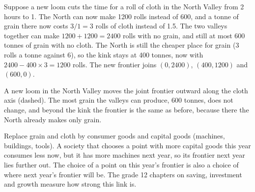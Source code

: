 \begin{example}\label{ex:g10:production-possibility-frontier:loom}
Suppose a new loom cuts the time for a roll of cloth in the North Valley from 2 hours to 1. The North
can now make \num{1200} rolls instead of 600, and a tonne of grain there now costs $3/1 = 3$ rolls of
cloth instead of 1.5. The two valleys together can make $1200 + 1200 = 2400$ rolls with no grain, and
still at most 600 tonnes of grain with no cloth. The North is still the cheaper place for grain (3 rolls
a tonne against 6), so the kink stays at 400 tonnes, now with $2400 - 400 \times 3 = 1200$ rolls. The
new frontier joins $(0, 2400)$, $(400, 1200)$ and $(600, 0)$.
\end{example}

\begin{omfigure}

{\small A new loom in the North Valley moves the joint frontier outward along the cloth axis (dashed).
The most grain the valleys can produce, 600 tonnes, does not change, and beyond the kink the frontier
is the same as before, because there the North already makes only grain.}
\end{omfigure}

\begin{remark}\label{rem:g10:production-possibility-frontier:invest}
Replace grain and cloth by consumer goods and capital goods (machines, buildings, tools). A society that
chooses a point with more capital goods this year consumes less now, but it has more machines next year,
so its frontier next year lies further out. The choice of a point on this year's frontier is also a
choice of where next year's frontier will be. The grade 12 chapters on saving, investment and growth
measure how strong this link is.
\end{remark}

